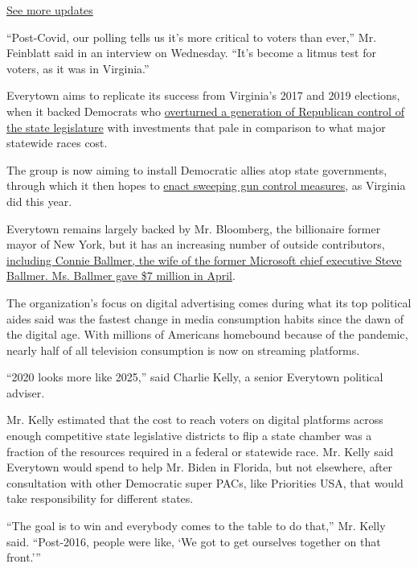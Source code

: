\href{https://www.nytimes.com/2020/08/04/us/elections/primary-election-michigan-arizona-kansas.html?action=click\&pgtype=Article\&state=default\&region=MAIN_CONTENT_1\&context=storylines_live_updates}{See
more updates}

``Post-Covid, our polling tells us it's more critical to voters than
ever,'' Mr. Feinblatt said in an interview on Wednesday. ``It's become a
litmus test for voters, as it was in Virginia.''

Everytown aims to replicate its success from Virginia's 2017 and 2019
elections, when it backed Democrats who
\href{https://www.nytimes.com/2019/11/05/us/politics/virginia-elections.html}{overturned
a generation of Republican control of the state legislature} with
investments that pale in comparison to what major statewide races cost.

The group is now aiming to install Democratic allies atop state
governments, through which it then hopes to
\href{https://www.nytimes.com/2020/04/13/us/virginia-democrats-new-laws.html}{enact
sweeping gun control measures}, as Virginia did this year.

Everytown remains largely backed by Mr. Bloomberg, the billionaire
former mayor of New York, but it has an increasing number of outside
contributors,
\href{https://twitter.com/teddyschleifer/status/1283561968436015106}{including
Connie Ballmer, the wife of the former Microsoft chief executive Steve
Ballmer. Ms. Ballmer gave \$7 million in April}.

The organization's focus on digital advertising comes during what its
top political aides said was the fastest change in media consumption
habits since the dawn of the digital age. With millions of Americans
homebound because of the pandemic, nearly half of all television
consumption is now on streaming platforms.

``2020 looks more like 2025,'' said Charlie Kelly, a senior Everytown
political adviser.

Mr. Kelly estimated that the cost to reach voters on digital platforms
across enough competitive state legislative districts to flip a state
chamber was a fraction of the resources required in a federal or
statewide race. Mr. Kelly said Everytown would spend to help Mr. Biden
in Florida, but not elsewhere, after consultation with other Democratic
super PACs, like Priorities USA, that would take responsibility for
different states.

``The goal is to win and everybody comes to the table to do that,'' Mr.
Kelly said. ``Post-2016, people were like, `We got to get ourselves
together on that front.'''


